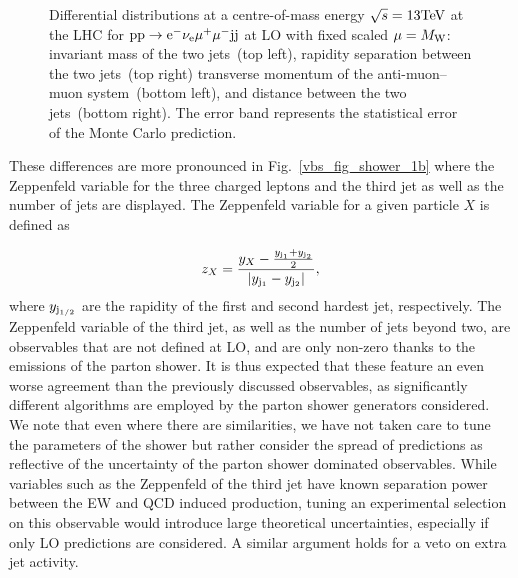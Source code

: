 \documentclass[11pt]{cernrep}
\begin{document}
\begin{figure}[htbp]
\begin{center}
\caption{Differential distributions at a centre-of-mass energy $\sqrt{s}=13{\rm TeV}$ at the LHC for ${\rm p} {\rm p}
  \to {\rm e}^-  \nu_{\rm e}  \mu^+ \mu^- {\rm j} {\rm j}$ at LO with fixed scaled $\mu = M_{\rm W}$: 
                invariant mass of the two jets~(top left),
                rapidity separation between the two jets~(top right)
                transverse momentum of the anti-muon--muon system~(bottom left), and
                distance between the two jets~(bottom right). The error band represents
                the statistical error of the Monte Carlo prediction. }
\label{vbs_fig_shower_1a}
\end{center}
\end{figure}

These differences are more pronounced in Fig.~\ref{vbs_fig_shower_1b} where the Zeppenfeld variable for the three charged leptons and the third jet as well as the number of jets are displayed.
The Zeppenfeld variable for a given particle $X$ is defined as

\begin{equation}
  z_{X} = \frac{y_{X}-\frac{y_{{\rm j}_1}+y_{{\rm j}_2}}2}{|y_{{\rm j}_1}-y_{{\rm j}_2}|} ,
\end{equation}
%
where $y_{{\rm j}_{1/2}}$ are the rapidity of the first and second hardest jet, respectively.
The Zeppenfeld variable of the third jet, as well as the number of jets beyond two, are observables that are not defined at LO,
and are only non-zero thanks to the emissions of the parton shower.
It is thus expected that these feature an even worse agreement than the previously discussed observables, as 
significantly different algorithms are employed by the parton shower generators considered. 
We note that even where there are similarities, we have not taken care to tune the parameters
of the shower but rather consider the spread of predictions as reflective of the uncertainty 
of the parton shower dominated observables. While variables such as the Zeppenfeld of the third jet
have known separation power between the EW and QCD induced production, tuning an experimental selection 
on this observable would introduce large theoretical uncertainties, especially if only LO predictions
are considered. A similar argument holds for a veto on extra jet activity.
\end{document}
